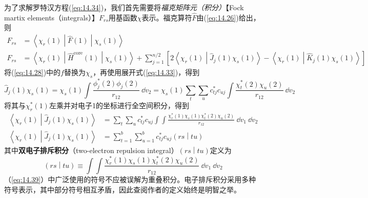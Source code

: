     为了求解罗特汉方程(\ref{eq:14.34})，我们首先需要将\textit{福克矩阵元（积分）}【Fock martix elements（integrals）】$F_{rs}$用基函数$\chi$表示。福克算符$\hat{F}$由(\ref{eq:14.26})给出，则
    \begin{align}
        F_{rs} &= \left\langle \chi_r \left(1\right) \middle| \hat{F} \left(1\right) \middle| \chi_s \left(1\right) \right\rangle \nonumber \\
        F_{rs} &= \left\langle \chi_r \left(1\right) \middle| \hat{H}^{\text{core}} \left(1\right) \middle| \chi_s \left(1\right) \right\rangle + \sum_{j=1}^{n/2} \left[ 2\left\langle \chi_r \left(1\right) \middle| \hat{J}_j \left(1\right) \chi_s \left(1\right) \right\rangle - \left\langle \chi_r \left(1\right) \middle| \hat{K}_j \left(1\right) \chi_s \left(1\right) \right\rangle \right] \label{eq:14.37}
    \end{align}
    将(\ref{eq:14.28})中的$f$替换为$\chi_s$，再使用展开式(\ref{eq:14.33})，得到
    \begin{equation*}
        \hat{J}_j \left(1\right) \chi_s \left(1\right) = \chi_s \left(1\right) \int \frac{\phi_j^* \left(2\right)\phi_j \left(2\right)}{r_{12}} \:\dd v_2 = \chi_s \left(1\right) \sum_{t} \sum_{u} c_{tj}^* c_{uj} \int \frac{\chi_t^* \left(2\right) \chi_u \left(2\right)}{r_{12}} \:\dd v_2
    \end{equation*}
    将其与$\chi_r^* \left(1\right)$左乘并对电子1的坐标进行全空间积分，得到
    \begin{align}
        \left\langle \chi_r \left(1\right) \middle| \hat{J}_j \left(1\right) \chi_s \left(1\right) \right\rangle &= \sum_{t} \sum_{u} c_{tj}^* c_{uj} \int \int \frac{
            \chi_r^* \left(1\right) \chi_s \left(1\right) \chi_t^* \left(2\right) \chi_u \left(2\right)
        }{r_{12}} \:\dd v_1 \:\dd v_2 \nonumber \\
        \left\langle \chi_r \left(1\right) \middle| \hat{J}_j \left(1\right) \chi_s \left(1\right) \right\rangle &= \sum_{t=1}^{b} \sum_{u=1}^{b} c_{tj}^* c_{uj} \left(rs \middle| tu\right) \label{eq:14.38}
    \end{align}
    其中\textbf{双电子排斥积分}（two-electron repulsion integral）$\left(rs \middle| tu\right)$定义为
    \begin{equation}
        \boxed{
            \left(rs \middle| tu\right) \equiv \int \int \frac{\chi_r^* \left(1\right) \chi_s \left(1\right) \chi_t^* \left(2\right) \chi_u \left(2\right)}{r_{12}} \:\dd v_1 \:\dd v_2
        }
        \label{eq:14.39}
    \end{equation}
    （\ref{eq:14.39}）中广泛使用的符号不应被误解为重叠积分。电子排斥积分采用多种符号表示，其中部分符号相互矛盾，因此查阅作者的定义始终是明智之举。

